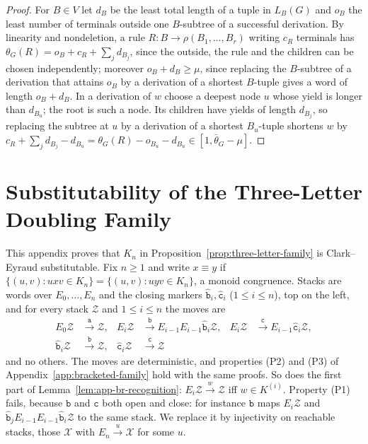\begin{proof}
For $B\in V$ let $d_B$ be the least total length of a tuple in $L_B(G)$ and $o_B$
the least number of terminals outside one $B$-subtree of a successful
derivation.  By linearity and nondeletion, a rule $R:B\to\rho(B_1,\ldots,B_r)$
writing $c_R$ terminals has $\theta_G(R)=o_B+c_R+\sum_jd_{B_j}$, since the outside,
the rule and the children can be chosen independently; moreover
$o_B+d_B\ge\mu$, since replacing the $B$-subtree of a derivation that attains $o_B$
by a derivation of a shortest $B$-tuple gives a word of length $o_B+d_B$.  In a derivation of $w$ choose a deepest node $u$ whose yield is
longer than $d_{B_u}$; the root is such a node.  Its children have yields of
length $d_{B_j}$, so replacing the subtree at $u$ by a derivation of a shortest
$B_u$-tuple shortens $w$ by
$c_R+\sum_jd_{B_j}-d_{B_u}=\theta_G(R)-o_{B_u}-d_{B_u}\in[1,\bar\theta_G-\mu]$.
\end{proof}

\section{Substitutability of the Three-Letter Doubling Family}
\label{app:three-letter-family}

This appendix proves that $K_n$ in Proposition~\ref{prop:three-letter-family} is
Clark--Eyraud substitutable.  Fix $n\ge1$ and write $x\equiv y$ if
$\{(u,v):uxv\in K_n\}=\{(u,v):uyv\in K_n\}$, a monoid congruence.  Stacks are
words over $E_0,\ldots,E_n$ and the closing markers $\hat{\mathtt b}_i,\hat{\mathtt c}_i$
($1\le i\le n$), top on the left, and for every stack $\mathcal Z$ and $1\le i\le n$
the moves are
\[
\begin{aligned}
E_0\mathcal Z&\xrightarrow{\mathtt a}\mathcal Z,&
E_i\mathcal Z&\xrightarrow{\mathtt b}E_{i-1}E_{i-1}\hat{\mathtt b}_i\mathcal Z,&
E_i\mathcal Z&\xrightarrow{\mathtt c}E_{i-1}\hat{\mathtt c}_i\mathcal Z,\\
\hat{\mathtt b}_i\mathcal Z&\xrightarrow{\mathtt b}\mathcal Z,&
\hat{\mathtt c}_i\mathcal Z&\xrightarrow{\mathtt c}\mathcal Z
\end{aligned}
\]
and no others.  The moves are deterministic, and properties (P2) and (P3) of
Appendix~\ref{app:bracketed-family} hold with the same proofs.  So does the first
part of Lemma~\ref{lem:app-br-recognition}: $E_i\mathcal Z\xrightarrow{w}\mathcal Z$ iff
$w\in K^{(i)}$.  Property (P1) fails, because $\mathtt b$ and $\mathtt c$ both open
and close: for instance $\mathtt b$ maps $E_i\mathcal Z$ and
$\hat{\mathtt b}_jE_{i-1}E_{i-1}\hat{\mathtt b}_i\mathcal Z$ to the same stack.  We
replace it by injectivity on reachable stacks, those $\mathcal X$ with
$E_n\xrightarrow{u}\mathcal X$ for some $u$.

